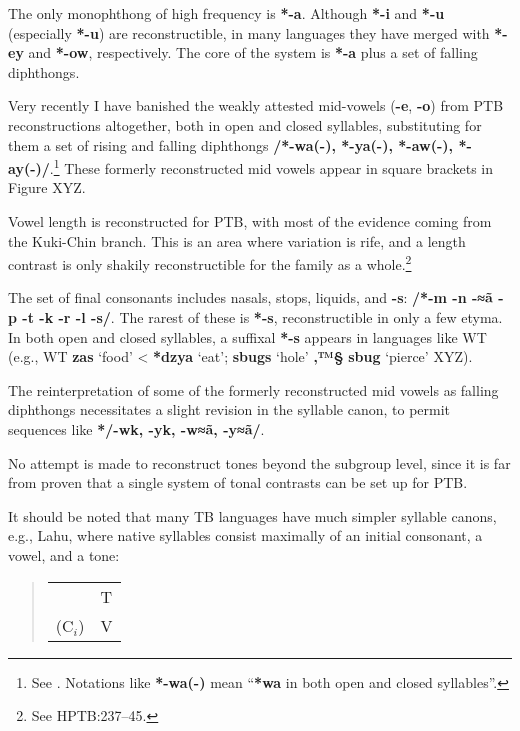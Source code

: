 The only monophthong of high frequency is \textbf{*-a}. Although \textbf{*-i} and \textbf{*-u} (especially \textbf{*-u}) are reconstructible, in many languages they have merged with \textbf{*-ey} and \textbf{*-ow}, respectively. The core of the system is \textbf{*-a} plus a set of falling diphthongs.

Very recently I have banished the weakly attested mid-vowels (\textbf{-e}, \textbf{-o}) from PTB reconstructions altogether, both in open and closed syllables, substituting for them a set of rising and falling diphthongs \textbf{/*-wa(-), *-ya(-), *-aw(-), *-ay(-)/}.\footnote{See \citep{JAM2014}. Notations like \textbf{*-wa(-)} mean “\textbf{*wa} in both open and closed syllables”.} These formerly reconstructed mid vowels appear in square brackets in Figure XYZ.

Vowel length is reconstructed for PTB, with most of the evidence coming from the Kuki-Chin branch. This is an area where variation is rife, and a length contrast is only shakily reconstructible for the family as a whole.\footnote{See HPTB:237–45.}

The set of final consonants includes nasals, stops, liquids, and \textbf{-s}: \textbf{/*-m -n -≈ã -p -t -k -r -l -s/}. The rarest of these is \textbf{*-s}, reconstructible in only a few etyma. In both open and closed syllables, a suffixal \textbf{*-s} appears in languages like WT (e.g., WT \textbf{zas} ‘food’ < \textbf{*dzya} ‘eat’; \textbf{sbugs} ‘hole’ \textbf{‚™§} \textbf{sbug} ‘pierce’ XYZ).

The reinterpretation of some of the formerly reconstructed mid vowels as falling diphthongs necessitates a slight revision in the syllable canon, to permit sequences like \textbf{*/-wk, -yk, -w≈ã, -y≈ã/}.

No attempt is made to reconstruct tones beyond the subgroup level, since it is far from proven that a single system of tonal contrasts can be set up for PTB.

It should be noted that many TB languages have much simpler syllable canons, e.g., Lahu, where native syllables consist maximally of an initial consonant, a vowel, and a tone:

\begin{quote}
\begin{tabular}{ll}
	&T\\
($\textrm{C}_i$)	&V\\
\end{tabular}
\end{quote}


